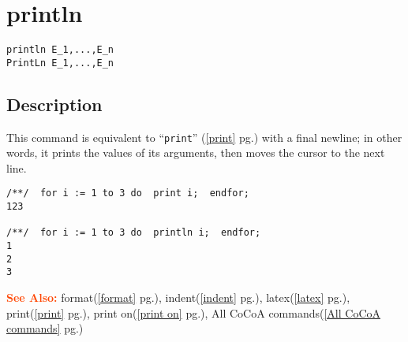\documentclass[a4paper]{mybook}
\newenvironment{command}{}{} %
\newcommand\SeeAlso{\par\textcolor{OrangeRed}{\textbf{\large See Also: }}}
\begin{document}
\section{println}
\label{println}
\begin{command} %


\begin{Verbatim}[label=syntax, rulecolor=\color{MidnightBlue},
frame=single]
println E_1,...,E_n
PrintLn E_1,...,E_n
\end{Verbatim}


\subsection*{Description}

This command is equivalent to ``\verb&print&'' (\ref{print} pg.\pageref{print}) with a final newline;
in other words, it prints the values of its arguments, then moves the
cursor to the next line.
\begin{Verbatim}[label=example, rulecolor=\color{PineGreen}, frame=single]
/**/  for i := 1 to 3 do  print i;  endfor;
123

/**/  for i := 1 to 3 do  println i;  endfor;
1
2
3
\end{Verbatim}


\SeeAlso %
  format(\ref{format} pg.\pageref{format}), 
    indent(\ref{indent} pg.\pageref{indent}), 
    latex(\ref{latex} pg.\pageref{latex}), 
    print(\ref{print} pg.\pageref{print}), 
    print on(\ref{print on} pg.\pageref{print on}), 
    All CoCoA commands(\ref{All CoCoA commands} pg.\pageref{All CoCoA commands})
\end{command} %
\end{document}
